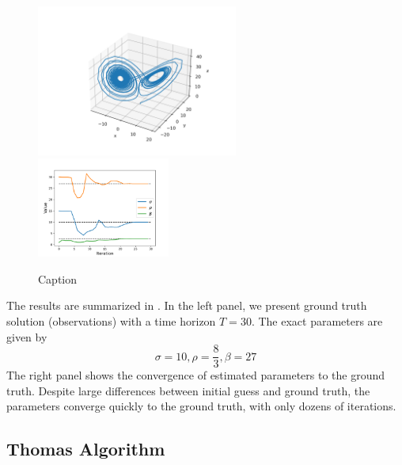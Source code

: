 \documentclass[3p,preprint,12pt]{elsarticle}
\begin{document}
\begin{figure}
    \centering
    \includegraphics[width=0.59\textwidth]{figures/lorentz.png}~
    \includegraphics[width=0.39\textwidth]{figures/lorentz_converge.png}
    \caption{Caption}
    \label{fig:rv-lorentz}
\end{figure}

The results are summarized in . In the left panel, we present ground truth solution (observations) with a time horizon $T=30$. The exact parameters are given by 
$$\sigma = 10, \rho = \frac{8}{3}, \beta = 27$$
The right panel shows the convergence of estimated parameters to the ground truth. Despite large differences between initial guess and ground truth, the parameters converge quickly to the ground truth, with only dozens of iterations. 

\subsection{Thomas Algorithm}
\end{document}
